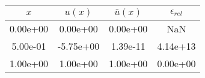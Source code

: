 \begin{tabular}{|c|c|c|c|}
\hline
\textbf{$x$}&\textbf{$u(x)$}&\textbf{$\bar{u}(x)$}&\textbf{$\epsilon_{rel}$}\\\hline
0.00e+00&0.00e+00&0.00e+00&NaN\\\hline
5.00e-01&-5.75e+00&1.39e-11&4.14e+13\\\hline
1.00e+00&1.00e+00&1.00e+00&0.00e+00\\\hline
\end{tabular}
